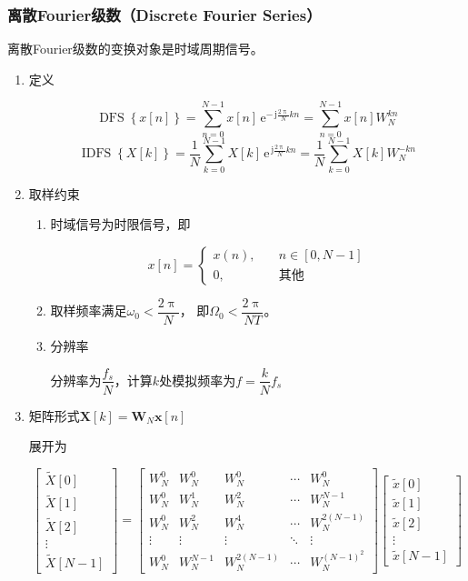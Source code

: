 \documentclass[UTF8,fontset=fandol,zihao=5]{ctexart}
\newcommand{\jj}{\,\mathrm{j}}
\newcommand{\ee}{\,\mathrm{e}}
\newcommand{\dfs}{\operatorname{DFS}}
\newcommand{\idfs}{\operatorname{IDFS}}
\newcommand{\vect}[1]{\boldsymbol{#1}}
\begin{document}
\subsubsection{离散Fourier级数（Discrete Fourier Series）}

离散Fourier级数的变换对象是时域周期信号。

\begin{enumerate}
  \item 定义
  
  \[
  \dfs\left\{x[n]\right\} = \sum_{n=0}^{N-1} x[n] \ee^{-\jj\frac{2\uppi}{N}kn}
  = \sum_{n=0}^{N-1} x[n] W_N^{kn}
  \]
  \[
  \idfs\left\{X[k]\right\} = \frac{1}{N} \sum_{k=0}^{N-1} X[k] \ee^{\jj\frac{2\uppi}{N}kn}
  = \frac{1}{N} \sum_{k=0}^{N-1} X[k] W_N^{-kn}
  \]
  
  \item 取样约束
  
  \begin{enumerate}[label=(\arabic*)]
    \item 时域信号为时限信号，即
    
    \[
    x[n]=
    \left\{\begin{aligned}
      x(n), \quad &n \in [0, N-1] \\
      0, \quad &\text{其他}
    \end{aligned}\right.
    \]

    \item 取样频率满足$\omega_0 < \dfrac{2\uppi}{N}$，
    即$\varOmega_0 < \dfrac{2\uppi}{NT}$。

    \item 分辨率
    
    分辨率为$\dfrac{f_s}{N}$，计算$k$处模拟频率为$f=\dfrac{k}{N}f_s$
  \end{enumerate}

  \item 矩阵形式$\vect X[k] = \vect W_N \vect x[n]$
  
  展开为

  \[
  \begin{bmatrix}
  \tilde{X}[0]\\
  \tilde{X}[1]\\
  \tilde{X}[2]\\
  \vdots\\
  \tilde{X}[N-1]
  \end{bmatrix}
  =
  \begin{bmatrix}
  W_N^0 & W_N^0 & W_N^0 & \cdots & W_N^0\\
  W_N^0 & W_N^1 & W_N^2 & \cdots & W_N^{N-1}\\
  W_N^0 & W_N^2 & W_N^4 & \cdots & W_N^{2(N-1)}\\
  \vdots & \vdots & \vdots & \ddots & \vdots\\
  W_N^0 & W_N^{N-1} & W_N^{2(N-1)} & \cdots & W_N^{(N-1)^2}
  \end{bmatrix}
  \begin{bmatrix}
  \tilde{x}[0]\\
  \tilde{x}[1]\\
  \tilde{x}[2]\\
  \vdots\\
  \tilde{x}[N-1]
  \end{bmatrix}
  \]


\end{enumerate}
\end{document}
